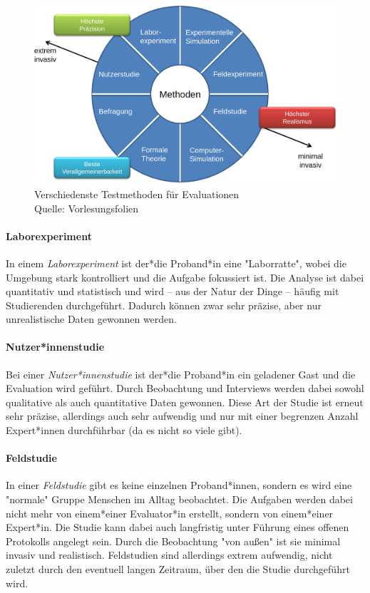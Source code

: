 			\begin{figure}
				\centering
				\includegraphics[width=0.8\linewidth]{evaluation}
				\caption[Verschiedenste Testmethoden für Evaluationen]{Verschiedenste Testmethoden für Evaluationen\\Quelle: Vorlesungsfolien}
				\label{fig:testmethoden}
			\end{figure}

			\paragraph{Laborexperiment}
				In einem \emph{Laborexperiment} ist der*die Proband*in eine "Laborratte", wobei die Umgebung stark kontrolliert und die Aufgabe fokussiert ist. Die Analyse ist dabei quantitativ und statistisch und wird -- aus der Natur der Dinge -- häufig mit Studierenden durchgeführt. Dadurch können zwar sehr präzise, aber nur unrealistische Daten gewonnen werden.

			\paragraph{Nutzer*innenstudie}
				Bei einer \emph{Nutzer*innenstudie} ist der*die Proband*in ein geladener Gast und die Evaluation wird geführt. Durch Beobachtung und Interviews werden dabei sowohl qualitative als auch quantitative Daten gewonnen. Diese Art der Studie ist erneut sehr präzise, allerdings auch sehr aufwendig und nur mit einer begrenzen Anzahl Expert*innen durchführbar (da es nicht so viele gibt).

			\paragraph{Feldstudie}
				In einer \emph{Feldstudie} gibt es keine einzelnen Proband*innen, sondern es wird eine "normale" Gruppe Menschen im Alltag beobachtet. Die Aufgaben werden dabei nicht mehr von einem*einer Evaluator*in erstellt, sondern von einem*einer Expert*in. Die Studie kann dabei auch langfristig unter Führung eines offenen Protokolls angelegt sein. Durch die Beobachtung "von außen" ist sie minimal invasiv und realistisch. Feldstudien sind allerdings extrem aufwendig, nicht zuletzt durch den eventuell langen Zeitraum, über den die Studie durchgeführt wird.

